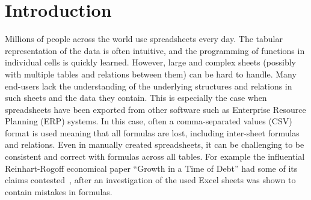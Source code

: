 \section{Introduction}
Millions of people across the world use spreadsheets every day.
The tabular representation of the data is often intuitive, and the programming of functions in individual cells is quickly learned.
However, large and complex sheets (possibly with multiple tables and relations between them) can be hard to handle.
Many end-users lack the understanding of the underlying structures and relations in such sheets and the data they contain.
This is especially the case when spreadsheets have been exported from other software such as Enterprise Resource Planning (ERP) systems.
In this case, often a comma-separated values (CSV) format is used meaning that all formulas are lost, including inter-sheet formulas and relations.
Even in manually created spreadsheets, it can be challenging to be consistent and correct with formulas across all tables.
For example the influential Reinhart-Rogoff economical paper ``Growth in a Time of Debt'' \cite{growth_in_time_of_debt} had some of its claims contested~\cite{flaw_excel}, after an investigation of the used Excel sheets was shown to contain mistakes in formulas.

